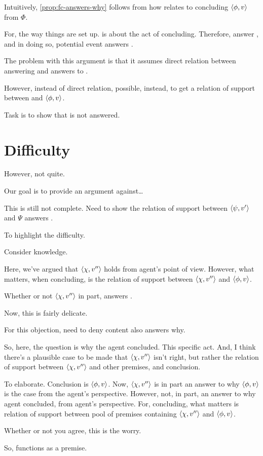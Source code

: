 \begin{note}
  Intuitively, \autoref{prop:fc-answers-why} follows from how \qzS{} relates to concluding \(\langle \phi, v \rangle\) from \(\Phi\).

  For, the way things are set up.
  \qzS{} is about the act of concluding.
  Therefore, answer \qzS{}, and in doing so, potential event answers \qWhy{}.
\end{note}

\begin{note}
  The problem with this argument is that it assumes direct relation between answering and answers to \qWhy{}.

  However, instead of direct relation, possible, instead, to get a relation of support between \fc{} and \(\langle \phi, v \rangle\).
\end{note}

\begin{note}
  Task is to show that \qzS{} is not answered.
\end{note}

\section{Difficulty}
\label{cha:zSpAwhy:sec:difficulty}

\begin{note}
  However, not quite.

  Our goal is to provide an argument against\dots

  This is still not complete.
  Need to show the relation of support between \(\langle \psi, v' \rangle\) and \(\Psi\) answers \qWhy{}.

  To highlight the difficulty.

  Consider knowledge.

  Here, we've argued that \(\langle \chi, v'' \rangle\) holds from agent's point of view.
  However, what matters, when concluding, is the relation of support between \(\langle \chi, v'' \rangle\) and \(\langle \phi, v \rangle\).

  Whether or not \(\langle \chi, v'' \rangle\) in part, answers \qWhy{}.
\end{note}

\begin{note}
  Now, this is fairly delicate.

  For this objection, need to deny content also answers why.

  So, here, the question is why the agent concluded.
  This specific act.
  And, I think there's a plausible case to be made that \(\langle \chi, v'' \rangle\) isn't right, but rather the relation of support between \(\langle \chi, v'' \rangle\) and other premises, and conclusion.

  To elaborate.
  Conclusion is \(\langle \phi, v \rangle\).
  Now, \(\langle \chi, v'' \rangle\) is in part an answer to why \(\langle \phi, v \rangle\) is the case from the agent's perspective.
  However, not, in part, an answer to why agent concluded, from agent's perspective.
  For, concluding, what matters is relation of support between pool of premises containing \(\langle \chi, v'' \rangle\) and \(\langle \phi, v \rangle\).

  Whether or not you agree, this is the worry.

  So, functions as a premise.
\end{note}

